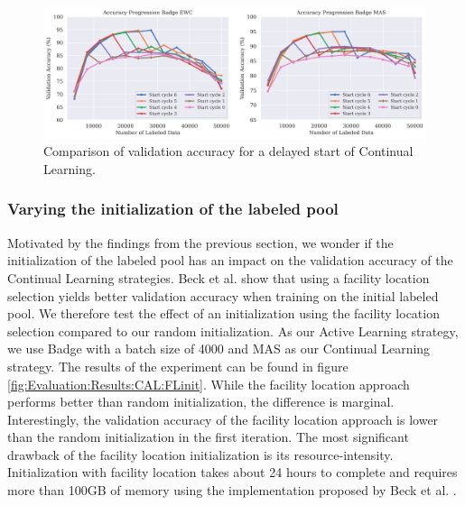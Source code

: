 \begin{figure}[h]
    \centering
    \includegraphics[width=\linewidth]{images/results_CAL/Delayed_start_CAL.png}
    \caption[Continual Active Learning Hybrid approach]{Comparison of validation accuracy for a delayed start of Continual Learning. }
    \label{fig:Evaluation:Results:CAL:DelayedStart}
\end{figure}

\subsubsection{Varying the initialization of the labeled pool}
\label{sec:Evaluation:Results:CAL:Initialization}
Motivated by the findings from the previous section, we wonder if the initialization of the labeled pool has an impact on the validation accuracy of the Continual Learning strategies. Beck et al.\cite{beck2021effective} show that using a facility location selection 
\cite{iyer2021submodular} yields better validation accuracy when training on the initial labeled pool. We therefore test the effect of an initialization using the facility location selection compared to our random initialization. As our Active Learning strategy,
we use Badge with a batch size of 4000 and MAS as our Continual Learning strategy. The results of the experiment can be found in figure \ref{fig:Evaluation:Results:CAL:FLinit}. While the facility location approach performs better than random initialization, the difference is
marginal. Interestingly, the validation accuracy of the facility location approach is lower than the random initialization in the first iteration. The most significant drawback of the facility location initialization is its resource-intensity. Initialization with facility
location takes about 24 hours to complete and requires more than 100GB of memory using the implementation proposed by Beck et al. \cite{beck2021effective}. \par

